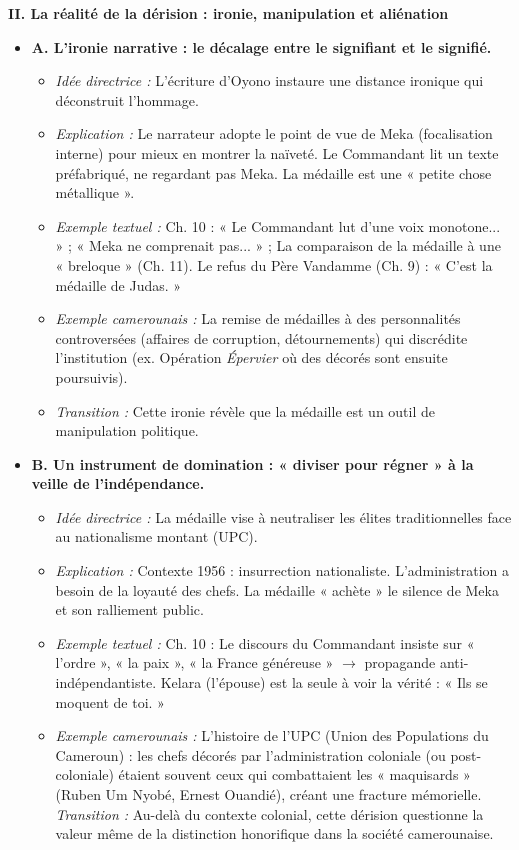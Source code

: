\documentclass[11pt]{article}
\begin{document}
\begin{exoresolu}
\medskip
\noindent \textbf{II. La réalité de la dérision : ironie, manipulation et aliénation}
\begin{itemize}
    \item \textbf{A. L'ironie narrative : le décalage entre le signifiant et le signifié.}
    \begin{itemize}
        \item \textit{Idée directrice :} L'écriture d'Oyono instaure une distance ironique qui déconstruit l'hommage.
        \item \textit{Explication :} Le narrateur adopte le point de vue de Meka (focalisation interne) pour mieux en montrer la naïveté. Le Commandant lit un texte préfabriqué, ne regardant pas Meka. La médaille est une « petite chose métallique ».
        \item \textit{Exemple textuel :} Ch. 10 : « Le Commandant lut d'une voix monotone... » ; « Meka ne comprenait pas... » ; La comparaison de la médaille à une « breloque » (Ch. 11). Le refus du Père Vandamme (Ch. 9) : « C'est la médaille de Judas. »
        \item \textit{Exemple camerounais :} La remise de médailles à des personnalités controversées (affaires de corruption, détournements) qui discrédite l'institution (ex. Opération \emph{Épervier} où des décorés sont ensuite poursuivis).
        \item \textit{Transition :} Cette ironie révèle que la médaille est un outil de manipulation politique.
    \end{itemize}
    \item \textbf{B. Un instrument de domination : « diviser pour régner » à la veille de l'indépendance.}
    \begin{itemize}
        \item \textit{Idée directrice :} La médaille vise à neutraliser les élites traditionnelles face au nationalisme montant (UPC).
        \item \textit{Explication :} Contexte 1956 : insurrection nationaliste. L'administration a besoin de la loyauté des chefs. La médaille « achète » le silence de Meka et son ralliement public.
        \item \textit{Exemple textuel :} Ch. 10 : Le discours du Commandant insiste sur « l'ordre », « la paix », « la France généreuse » $\to$ propagande anti-indépendantiste. Kelara (l'épouse) est la seule à voir la vérité : « Ils se moquent de toi. »
        \item \textit{Exemple camerounais :} L'histoire de l'UPC (Union des Populations du Cameroun) : les chefs décorés par l'administration coloniale (ou post-coloniale) étaient souvent ceux qui combattaient les « maquisards » (Ruben Um Nyobé, Ernest Ouandié), créant une fracture mémorielle.
        \textit{Transition :} Au-delà du contexte colonial, cette dérision questionne la valeur même de la distinction honorifique dans la société camerounaise.
    \end{itemize}
\end{itemize}


\end{exoresolu}
\end{document}
